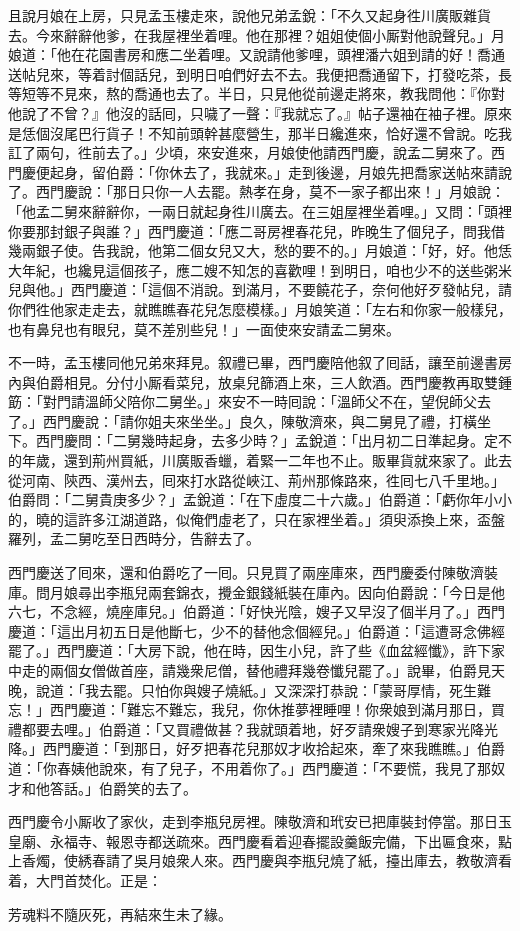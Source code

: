 且說月娘在上房，只見孟玉樓走來，說他兄弟孟銳：「不久又起身徃川廣販雜貨去。今來辭辭他爹，在我屋裡坐着哩。他在那裡？姐姐使個小厮對他說聲兒。」月娘道：「他在花園書房和應二坐着哩。又說請他爹哩，頭裡潘六姐到請的好！喬通送帖兒來，等着討個話兒，到明日咱們好去不去。我便把喬通留下，打發吃茶，長等短等不見來，熬的喬通也去了。半日，只見他從前邊走將來，教我問他：『你對他說了不曾？』他沒的話囘，只噦了一聲：『我就忘了。』{}帖子還袖在袖子裡。原來是恁個沒尾巴行貨子！不知前頭幹甚麼營生，那半日纔進來，恰好還不曾說。吃我訌了兩句，徃前去了。」少頃，來安進來，月娘使他請西門慶，說孟二舅來了。西門慶便起身，留伯爵：「你休去了，我就來。」走到後邊，月娘先把喬家送帖來請說了。西門慶說：「那日只你一人去罷。熱孝在身，莫不一家子都出來！」{}月娘說：「他孟二舅來辭辭你，一兩日就起身徃川廣去。在三姐屋裡坐着哩。」又問：「頭裡你要那封銀子與誰？」西門慶道：「應二哥房裡春花兒，昨晚生了個兒子，問我借幾兩銀子使。告我說，他第二個女兒又大，愁的要不的。」月娘道：「好，好。他恁大年紀，也纔見這個孩子，應二嫂不知怎的喜歡哩！{}到明日，咱也少不的送些粥米兒與他。」西門慶道：「這個不消說。到滿月，不要饒花子，奈何他好歹發帖兒，請你們徃他家走走去，就瞧瞧春花兒怎麼模樣。」{}月娘笑道：「左右和你家一般樣兒，也有鼻兒也有眼兒，莫不差別些兒！」一面使來安請孟二舅來。

不一時，孟玉樓同他兄弟來拜見。叙禮已畢，西門慶陪他叙了囘話，讓至前邊書房內與伯爵相見。分付小厮看菜兒，放桌兒篩酒上來，三人飲酒。西門慶教再取雙鍾筯：「對門請溫師父陪你二舅坐。」來安不一時囘說：「溫師父不在，望倪師父去了。」{}西門慶說：「請你姐夫來坐坐。」良久，陳敬濟來，與二舅見了禮，{}打橫坐下。西門慶問：「二舅幾時起身，去多少時？」孟銳道：「出月初二日準起身。定不的年歲，還到荊州買紙，川廣販香蠟，着緊一二年也不止。販畢貨就來家了。此去從河南、陝西、漢州去，囘來打水路從峽江、荊州那條路來，徃囘七八千里地。」伯爵問：「二舅貴庚多少？」孟銳道：「在下虛度二十六歲。」伯爵道：「虧你年小小的，曉的這許多江湖道路，似俺們虛老了，只在家裡坐着。」{}須臾添換上來，盃盤羅列，孟二舅吃至日西時分，告辭去了。

西門慶送了囘來，還和伯爵吃了一囘。只見買了兩座庫來，西門慶委付陳敬濟裝庫。問月娘尋出李瓶兒兩套錦衣，攪金銀錢紙裝在庫內。因向伯爵說：「今日是他六七，不念經，燒座庫兒。」伯爵道：「好快光陰，嫂子又早沒了個半月了。」西門慶道：「這出月初五日是他斷七，少不的替他念個經兒。」伯爵道：「這遭哥念佛經罷了。」{}西門慶道：「大房下說，他在時，因生小兒，許了些《血盆經懺》，許下家中走的兩個女僧做首座，請幾衆尼僧，替他禮拜幾卷懺兒罷了。」說畢，伯爵見天晚，說道：「我去罷。只怕你與嫂子燒紙。」又深深打恭說：「蒙哥厚情，死生難忘！」西門慶道：「難忘不難忘，我兒，你休推夢裡睡哩！你衆娘到滿月那日，買禮都要去哩。」伯爵道：「又買禮做甚？我就頭着地，好歹請衆嫂子到寒家光降光降。」西門慶道：「到那日，好歹把春花兒那奴才收拾起來，牽了來我瞧瞧。」{}伯爵道：「你春姨他說來，有了兒子，不用着你了。」西門慶道：「不要慌，我見了那奴才和他答話。」伯爵笑的去了。

西門慶令小厮收了家伙，走到李瓶兒房裡。陳敬濟和玳安已把庫裝封停當。那日玉皇廟、永福寺、報恩寺都送疏來。西門慶看着迎春擺設羹飯完備，下出匾食來，點上香燭，使綉春請了吳月娘衆人來。西門慶與李瓶兒燒了紙，擡出庫去，教敬濟看着，大門首焚化。正是：

\begin{myquote} 
芳魂料不隨灰死，再結來生未了緣。
\end{myquote} 


